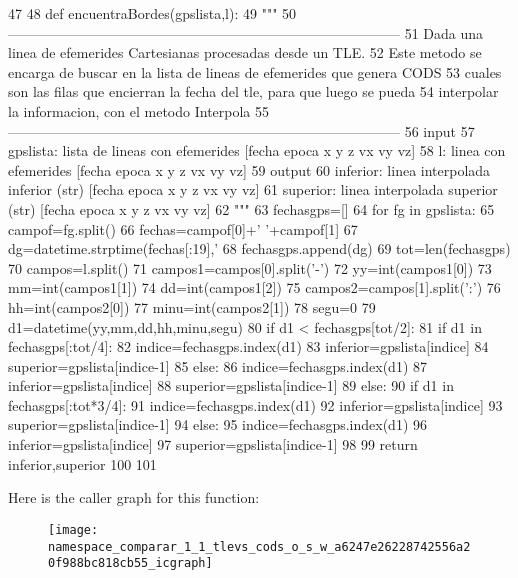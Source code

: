 \begin{DoxyCode}
47 
48 def encuentraBordes(gpslista,l):
49     """
50    
       ------------------------------------------------------------------------------------
51     Dada una linea de efemerides Cartesianas procesadas desde un TLE. 
52     Este metodo se encarga de buscar en la lista de lineas de efemerides que
       genera CODS
53     cuales son las filas que encierran  la fecha del tle, para que luego se
       pueda
54     interpolar la informacion, con el metodo Interpola
55    
       ------------------------------------------------------------------------------------
56     input
57         gpslista: lista de lineas con efemerides [fecha epoca x y z vx vy vz]
58         l: linea con efemerides [fecha epoca x y z vx vy vz]
59     output
60         inferior: linea interpolada inferior (str) [fecha epoca x y z vx vy vz]
61         superior: linea interpolada superior (str) [fecha epoca x y z vx vy vz]
62     """
63     fechasgps=[]
64     for fg in gpslista:
65         campof=fg.split()
66         fechas=campof[0]+' '+campof[1]
67         dg=datetime.strptime(fechas[:19],'%
68         fechasgps.append(dg)
69     tot=len(fechasgps)
70     campos=l.split()
71     campos1=campos[0].split('-')
72     yy=int(campos1[0])
73     mm=int(campos1[1])
74     dd=int(campos1[2])
75     campos2=campos[1].split(':')
76     hh=int(campos2[0])
77     minu=int(campos2[1])
78     segu=0
79     d1=datetime(yy,mm,dd,hh,minu,segu)      
80     if d1 < fechasgps[tot/2]:
81         if d1 in fechasgps[:tot/4]:
82             indice=fechasgps.index(d1)
83             inferior=gpslista[indice]
84             superior=gpslista[indice-1]
85         else:
86             indice=fechasgps.index(d1)
87             inferior=gpslista[indice]
88             superior=gpslista[indice-1]
89     else:
90         if d1 in fechasgps[:tot*3/4]:
91             indice=fechasgps.index(d1)
92             inferior=gpslista[indice]
93             superior=gpslista[indice-1]
94         else:
95             indice=fechasgps.index(d1)
96             inferior=gpslista[indice]
97             superior=gpslista[indice-1]
98                 
99     return inferior,superior
100              
101 

\end{DoxyCode}


\-Here is the caller graph for this function\-:\nopagebreak
\begin{figure}[H]
\begin{center}
\leavevmode
\texttt{[image: namespace\_comparar\_1\_1\_tlevs\_cods\_o\_s\_w\_a6247e26228742556a20f988bc818cb55\_icgraph]}
\end{center}
\end{figure}


